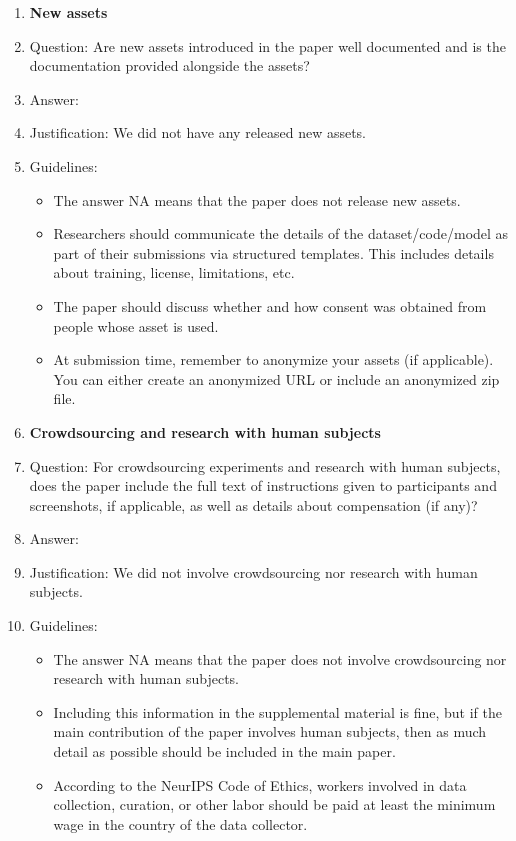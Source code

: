 \documentclass{article}
\theoremstyle{plain}
\theoremstyle{definition}
\theoremstyle{remark}
\begin{document}
\begin{enumerate}
\item {\bf New assets}
    \item[] Question: Are new assets introduced in the paper well documented and is the documentation provided alongside the assets?
    \item[] Answer: \answerNA{}%
    \item[] Justification: We did not have any released new assets.
    \item[] Guidelines:
    \begin{itemize}
        \item The answer NA means that the paper does not release new assets.
        \item Researchers should communicate the details of the dataset/code/model as part of their submissions via structured templates. This includes details about training, license, limitations, etc. 
        \item The paper should discuss whether and how consent was obtained from people whose asset is used.
        \item At submission time, remember to anonymize your assets (if applicable). You can either create an anonymized URL or include an anonymized zip file.
    \end{itemize}

\item {\bf Crowdsourcing and research with human subjects}
    \item[] Question: For crowdsourcing experiments and research with human subjects, does the paper include the full text of instructions given to participants and screenshots, if applicable, as well as details about compensation (if any)? 
    \item[] Answer: \answerNA{} %
    \item[] Justification: We did not involve crowdsourcing nor research with human subjects.
    \item[] Guidelines:
    \begin{itemize}
        \item The answer NA means that the paper does not involve crowdsourcing nor research with human subjects.
        \item Including this information in the supplemental material is fine, but if the main contribution of the paper involves human subjects, then as much detail as possible should be included in the main paper. 
        \item According to the NeurIPS Code of Ethics, workers involved in data collection, curation, or other labor should be paid at least the minimum wage in the country of the data collector. 
    \end{itemize}


\end{enumerate}
\end{document}
